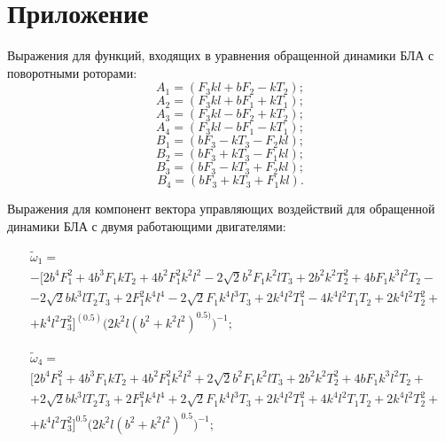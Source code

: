 \chapter{Приложение}

Выражения для функций, входящих в уравнения обращенной динамики БЛА с поворотными роторами:
\begin{equation}
A_1 = (F_3kl + bF_2 - kT_2); \label{eq:app_solve_AB_begin}
\end{equation}
\begin{equation}
A_2 = (F_3kl + bF_1 + kT_1);
\end{equation}
\begin{equation}
A_3 = (F_3kl - bF_2 + kT_2);
\end{equation}
\begin{equation}
A_4 = (F_3kl - bF_1 - kT_1);
\end{equation}
\begin{equation}
B_1 = (bF_3 - kT_3 - F_2kl);
\end{equation}
\begin{equation}
B_2 = (bF_3 + kT_3 - F_1kl);
\end{equation}
\begin{equation}
B_3 = (bF_3 - kT_3 + F_2kl);
\end{equation}
\begin{equation}
B_4 = (bF_3 + kT_3 + F_1kl). \label{eq:app_solve_AB_end}
\end{equation}

Выражения для компонент вектора управляющих воздействий для обращенной динамики БЛА с двумя работающими двигателями: 

\begin{equation} \label{eq:app_em_solve_begin}
\begin{aligned}
&\tilde \omega_1 = \\&-\Big[2b^4F_1^2 + 4b^3F_1kT_2 + 4b^2F_1^2k^2l^2 - 2\sqrt{2}b^2F_1k^2lT_3 + 2b^2k^2T_2^2 + 4bF_1k^3l^2T_2 -\\ &-2\sqrt{2}bk^3lT_2T_3 + 2F_1^2k^4l^4 - 2\sqrt{2}F_1k^4l^3T_3 + 2k^4l^2T_1^2 - 4k^4l^2T_1T_2 + 2k^4l^2T_2^2 +\\ &+k^4l^2T_3^2 \Big]^{(0.5)} \Big(2k^2l(b^2 + k^2l^2)^{0.5)}\Big)^{-1};
\end{aligned}
\end{equation}

\begin{equation}
\begin{aligned}
&\tilde \omega_4 = \\&\Big[2b^4F_1^2 + 4b^3F_1kT_2 + 4b^2F_1^2k^2l^2 + 2\sqrt{2}b^2F_1k^2lT_3 + 2b^2k^2T_2^2 + 4bF_1k^3l^2T_2 + \\& +2\sqrt{2}bk^3lT_2T_3 + 2F_1^2k^4l^4 + 2\sqrt{2}F_1k^4l^3T_3 + 2k^4l^2T_1^2 + 4k^4l^2T_1T_2 + 2k^4l^2T_2^2 + \\& +k^4l^2T_3^2\Big]^{0.5} \Big(2k^2l(b^2 + k^2l^2)^{0.5}\Big)^{-1};
\end{aligned}
\end{equation}

